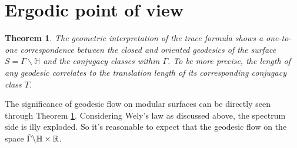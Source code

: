 \documentclass[12pt,a4paper,english]{article}
\theoremstyle{plain}
\newtheorem{thm}{Theorem}[section]
\theoremstyle{definition}
\theoremstyle{remark}
\begin{document}
\section{Ergodic point of view}

\begin{thm}\label{geodesictoconjugacy}
   The geometric interpretation of the trace formula shows a one-to-one correspondence between the closed and oriented geodesics of the surface $S=\Gamma\backslash \mathbb{H}$ and the conjugacy classes within $\Gamma$. To be more precise, the length of any geodesic correlates to the translation length of its corresponding conjugacy class ${T}$. 
\end{thm}

The significance of geodesic flow on modular surfaces can be directly seen through Theorem \ref{geodesictoconjugacy}. Considering Wely's law as discussed above, the spectrum side is illy exploded. So it's reasonable to expect that the geodesic flow on the space $\Tilde{\Gamma}\backslash \mathbb{H}\times \mathbb{R}$.
\newpage


\end{document}
